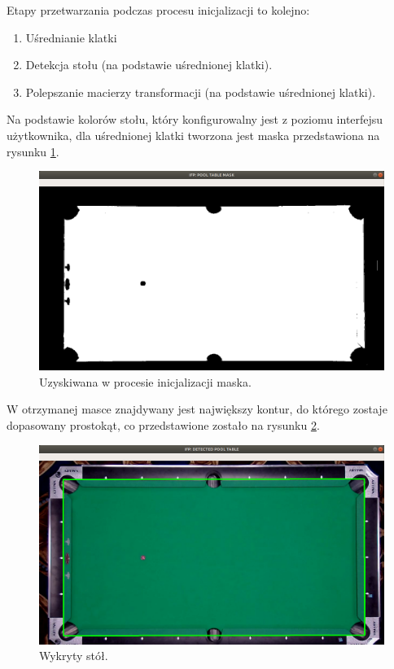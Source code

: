 \documentclass[12pt]{article}
\begin{document}
Etapy przetwarzania podczas procesu inicjalizacji to kolejno:
    \begin{enumerate} [noitemsep]
        \item Uśrednianie klatki
        \item Detekcja stołu (na podstawie uśrednionej klatki).
        \item Polepszanie macierzy transformacji (na podstawie uśrednionej klatki).
    \end{enumerate}
    
    Na podstawie kolorów stołu, który konfigurowalny jest z poziomu interfejsu użytkownika, dla uśrednionej klatki tworzona jest maska przedstawiona na rysunku \ref{pool_table_mask}.

    \begin{figure}[!htb]
        \centering
        \includegraphics[width=15cm]{./images/obrazki/inicjalizacja/pool_table_mask.png}
        \caption{Uzyskiwana w procesie inicjalizacji maska.}
        \label{pool_table_mask}
    \end{figure}


    W otrzymanej masce znajdywany jest największy kontur, do którego zostaje dopasowany prostokąt, co przedstawione zostało na rysunku \ref{detected_pool_table}. %

    \begin{figure}[!htb]
        \centering
        \includegraphics[width=15cm]{./images/obrazki/inicjalizacja/detected_pool_table.png}
        \caption{Wykryty stół.}
        \label{detected_pool_table}
    \end{figure}
\end{document}
